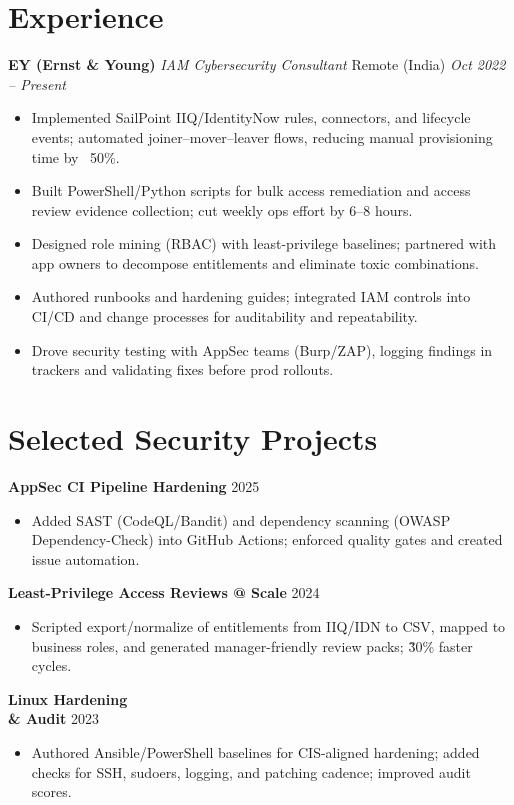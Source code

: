 \documentclass[11pt]{article}
\newcommand{\location}[1]{\hfill {\small #1}}
\newcommand{\daterange}[1]{\hfill {\small #1}}
\begin{document}
\section*{Experience}
\textbf{EY (Ernst \& Young)} \emph{IAM Cybersecurity Consultant} \location{Remote (India)} \daterange{\textit{Oct 2022 -- Present}}\\
\begin{itemize}
  \item Implemented SailPoint IIQ/IdentityNow rules, connectors, and lifecycle events; automated joiner–mover–leaver flows, reducing manual provisioning time by ~50\%.
  \item Built PowerShell/Python scripts for bulk access remediation and access review evidence collection; cut weekly ops effort by 6–8 hours.
  \item Designed role mining (RBAC) with least-privilege baselines; partnered with app owners to decompose entitlements and eliminate toxic combinations.
  \item Authored runbooks and hardening guides; integrated IAM controls into CI/CD and change processes for auditability and repeatability.
  \item Drove security testing with AppSec teams (Burp/ZAP), logging findings in trackers and validating fixes before prod rollouts.
\end{itemize}

\section*{Selected Security Projects}
\textbf{AppSec CI Pipeline Hardening} \daterange{2025}\\
\begin{itemize}
  \item Added SAST (CodeQL/Bandit) and dependency scanning (OWASP Dependency-Check) into GitHub Actions; enforced quality gates and created issue automation.
\end{itemize}
\textbf{Least-Privilege Access Reviews @ Scale} \daterange{2024}\\
\begin{itemize}
  \item Scripted export/normalize of entitlements from IIQ/IDN to CSV, mapped to business roles, and generated manager-friendly review packs; \~30\% faster cycles.
\end{itemize}
\textbf{Linux Hardening \\& Audit} \daterange{2023}\\
\begin{itemize}
  \item Authored Ansible/PowerShell baselines for CIS-aligned hardening; added checks for SSH, sudoers, logging, and patching cadence; improved audit scores.
\end{itemize}
\end{document}
